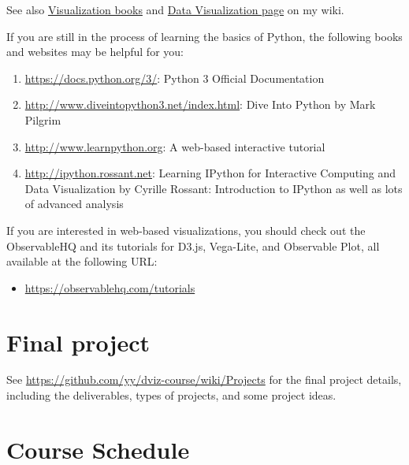 \documentclass[11pt,article,oneside]{memoir} %
\begin{document}
See also \href{https://yyiki.org/wiki/Data%20visualization/Books/}{Visualization books} and \href{https://yyiki.org/wiki/Data%20visualization/}{Data Visualization page} on my wiki. 


If you are still in the process of learning the basics of Python, the following books and websites may be helpful for you:

\begin{enumerate}%

\item \url{https://docs.python.org/3/}: Python 3 Official Documentation

\item \url{http://www.diveintopython3.net/index.html}: Dive Into Python by Mark Pilgrim 

\item \url{http://www.learnpython.org}: A web-based interactive tutorial 

\item \url{http://ipython.rossant.net}: Learning IPython for Interactive Computing and Data Visualization by Cyrille Rossant: Introduction to IPython as well as lots of advanced analysis 

\end{enumerate}%

If you are interested in web-based visualizations, you should check out the ObservableHQ and its tutorials for D3.js, Vega-Lite, and Observable Plot, all available at the following URL:

\begin{itemize}
    \item \url{https://observablehq.com/tutorials}
\end{itemize}



\section{Final project}%

See \url{https://github.com/yy/dviz-course/wiki/Projects} for the final project details, including the deliverables, types of projects, and some project ideas. 


\section{Course Schedule}%
\end{document}

